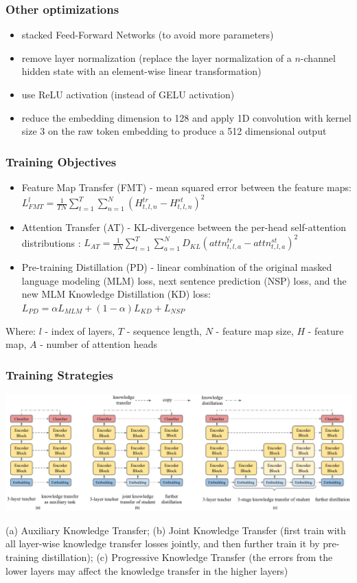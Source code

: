 \documentclass{beamer}
\begin{document}
\begin{frame}
    \frametitle{Other optimizations}
    \begin{itemize}
        \item stacked Feed-Forward Networks (to avoid more parameters)
        \item remove layer normalization (replace the
layer normalization of a $n$-channel hidden state with an element-wise linear transformation)
        \item use ReLU activation (instead of GELU activation)
        \item reduce the embedding dimension to 128 and apply 1D convolution with kernel size 3 on the raw token embedding to produce a 512 dimensional output
    \end{itemize}
\end{frame}

\begin{frame}
    \frametitle{Training Objectives}
    \begin{itemize}
        \item Feature Map Transfer (FMT) - mean squared error between the feature maps: $ L_{FMT}^l = \frac{1}{TN} \sum_{t=1}^T \sum_{n=1}^N (H_{t,l,n}^{tr} - H_{t,l,n}^{st})^2 $
        \item Attention Transfer (AT) - KL-divergence between the per-head self-attention distributions : $ L_{AT} = \frac{1}{TN} \sum_{t=1}^T \sum_{a=1}^N D_{KL}(attn_{t,l,a}^{tr} - attn_{t,l,a}^{st})^2 $
        \item Pre-training Distillation (PD) - linear combination of the original masked language modeling (MLM) loss, next sentence prediction (NSP) loss, and the new MLM Knowledge Distillation (KD) loss: $ L_{PD} = \alpha L_{MLM} + (1 - \alpha) L_{KD} + L_{NSP} $
    \end{itemize}
    \tiny Where: $l$ - index of layers, $T$ - sequence length, $N$ - feature map size, $H$ - feature map, $A$ - number of attention heads
\end{frame}


\begin{frame}
    \frametitle{Training Strategies}
    \begin{center}
        \includegraphics[scale=0.3]{img/mobile_bert_training.png}
    \end{center}
    \tiny(a) Auxiliary Knowledge Transfer; (b) Joint Knowledge Transfer (first train with all layer-wise knowledge transfer losses jointly, and then further train it by pre-training distillation); (c) Progressive Knowledge Transfer (the errors from the lower layers may affect the knowledge transfer in the higher layers)
\end{frame}
\end{document}
